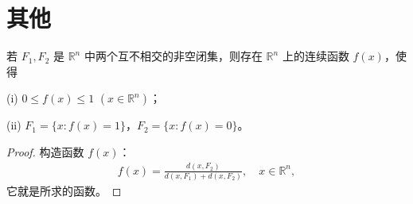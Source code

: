 \documentclass[../../main.tex]{subfiles}%
\begin{document}
\section{其他}

\begin{lemma}
若 \(F_1,F_2\) 是 \(\mathbb{R}^n\) 中两个互不相交的非空闭集，则存在 \(\mathbb{R}^n\) 上的连续函数 \(f(x)\)，使得

(i) \(0\leqslant f(x)\leqslant 1\) \((x\in\mathbb{R}^n)\)；

(ii) \(F_1 = \{x: f(x) = 1\}\)，\(F_2 = \{x: f(x) = 0\}\)。
\end{lemma}
\begin{proof}
构造函数 \(f(x)\)：
\begin{align*}
f(x)=\frac{d(x,F_2)}{d(x,F_1)+d(x,F_2)}, \quad x\in\mathbb{R}^n,
\end{align*}
它就是所求的函数。 
\end{proof}
\end{document}
